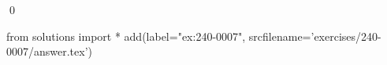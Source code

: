 
\begin{ex} 
  \label{ex:240-0007}
  
  \qed
\end{ex} 
\begin{python0}
from solutions import *
add(label="ex:240-0007",
    srcfilename='exercises/240-0007/answer.tex') 
\end{python0}
